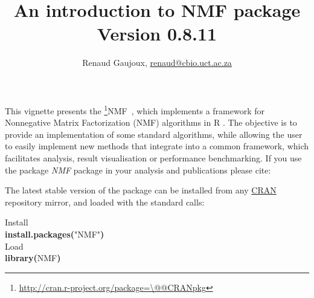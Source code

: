 \documentclass[a4paper]{article}\usepackage{graphicx, color}
\makeatletter
\newcommand{\hlfunctioncall}[1]{\textcolor[rgb]{0.501960784313725,0,0.329411764705882}{\textbf{#1}}}%
\newcommand{\hlstring}[1]{\textcolor[rgb]{0.6,0.6,1}{#1}}%
\newcommand{\hlkeyword}[1]{\textcolor[rgb]{0,0,0}{\textbf{#1}}}%
\newcommand{\hlcomment}[1]{\textcolor[rgb]{0.180392156862745,0.6,0.341176470588235}{#1}}%
\newcommand{\hlsymbol}[1]{\textcolor[rgb]{0,0,0}{#1}}%
\newcommand{\hlstd}[1]{\textcolor[rgb]{0,0,0}{#1}}%
\newenvironment{kframe}{%
 \def\FrameCommand##1{\hskip\@totalleftmargin \hskip-\fboxsep
 \colorbox{shadecolor}{##1}\hskip-\fboxsep
     \hskip-\linewidth \hskip-\@totalleftmargin \hskip\columnwidth}%
 \MakeFramed {\advance\hsize-\width
   \@totalleftmargin\z@ \linewidth\hsize
   \@setminipage}}%
 {\par\unskip\endMakeFramed}
\newenvironment{knitrout}{}{} %
\newcommand{\pkgname}[1]{\textit{#1}\xspace}
\newcommand{\Rpkg}[1]{\pkgname{#1} package\xspace}
\newcommand{\CRANurl}[1]{\url{http://cran.r-project.org/package=#1}}
\def\CRANpkg{\@ifstar\@CRANpkg\@@CRANpkg}
\def\@CRANpkg#1{\href{http://cran.r-project.org/package=#1}{\pkgname{#1}}\footnote{\CRANurl{#1}}}
\def\@@CRANpkg#1{\href{http://cran.r-project.org/package=#1}{\pkgname{#1}} package\footnote{\CRANurl{#1}}}
\newcommand{\citeCRANpkg}[1]{\CRANpkg{#1}~\cite{#1}}
\newcommand{\nmfpack}{\Rpkg{NMF}}
\makeatother
\begin{document}




\title{An introduction to NMF package\\\small Version
0.8.11}
\author{Renaud Gaujoux, \url{renaud@cbio.uct.ac.za}}

\maketitle

This vignette presents the \citeCRANpkg{NMF}, which implements a framework
for Nonnegative Matrix Factorization (NMF) algorithms in R \cite{R}.
The objective is to provide an implementation of some standard algorithms, while
allowing the user to easily implement new methods that integrate into a
common framework, which facilitates analysis, result visualisation or
performance benchmarking.
If you use the package \nmfpack in your analysis and publications please cite:

\bigskip
{}

The latest stable version of the package can be installed from any
\href{http://cran.r-project.org}{CRAN} repository mirror, and loaded with the
standard calls:
\begin{knitrout}
\color{fgcolor}\begin{kframe}
\begin{flushleft}
\ttfamily\noindent
\hlcomment{\usebox{\hlnormalsizeboxhash}{\ }Install}\hspace*{\fill}\\
\hlstd{}\hlfunctioncall{install.packages}\hlkeyword{(}\hlstring{"{}NMF"{}}\hlkeyword{)}\hspace*{\fill}\\
\hlstd{}\hlcomment{\usebox{\hlnormalsizeboxhash}{\ }Load}\hspace*{\fill}\\
\hlstd{}\hlfunctioncall{library}\hlkeyword{(}\hlsymbol{NMF}\hlkeyword{)}\mbox{}
\normalfont
\end{flushleft}
\end{kframe}
\end{knitrout}
\end{document}
